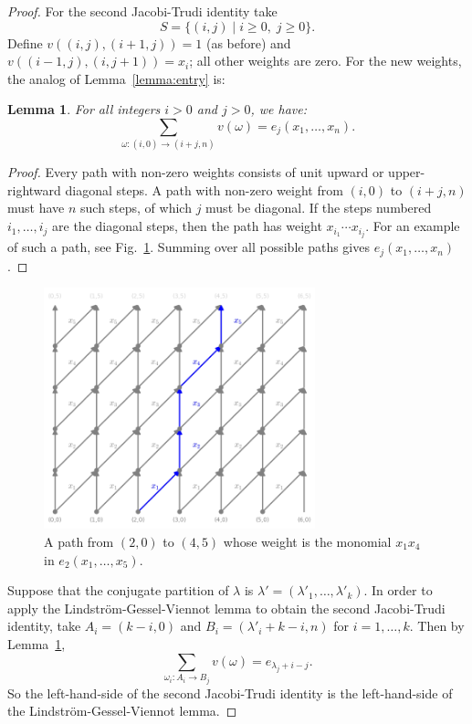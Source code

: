 \documentclass[11pt]{amsproc}
\newtheorem{lemma}[theorem]{Lemma}
\theoremstyle{definition}
\theoremstyle{example}
\begin{document}
\begin{proof}
  For the second Jacobi-Trudi identity take
  \begin{displaymath}
    S = \{(i,j)\mid i\geq 0,\;j\geq 0\}.
  \end{displaymath}
  Define $v((i,j),(i+1,j))=1$ (as before) and $v((i-1,j),(i,j+1))=x_i$; all other weights are zero.
  For the new weights, the analog of Lemma~\ref{lemma:entry} is:
  \begin{lemma}
    \label{lemma:entry-e}
    For all integers $i>0$ and $j>0$, we have:
    \begin{displaymath}
      \sum_{\omega:(i,0)\to (i+j,n)} v(\omega) = e_j(x_1,\dotsc,x_n).
    \end{displaymath}
  \end{lemma}
  \begin{proof}
    Every path with non-zero weights consists of unit upward or upper-rightward diagonal steps.
    A path with non-zero weight from $(i,0)$ to $(i+j,n)$ must have $n$ such steps, of which $j$ must be diagonal.
    If the steps numbered $i_1,\dotsc,i_j$ are the diagonal steps, then the path has weight $x_{i_1}\dotsb x_{i_j}$.
    For an example of such a path, see Fig.~\ref{fig:example_path_e}.
    Summing over all possible paths gives $e_j(x_1,\dotsc,x_n)$.
  \end{proof}
  \begin{figure}
    \centering
    \includegraphics[width=0.7\textwidth]{path_example2.png}
    \caption{A path from $(2,0)$ to $(4,5)$ whose weight is the monomial $x_1x_4$ in $e_2(x_1,\dotsc,x_5)$.}
    \label{fig:example_path_e}
  \end{figure}
  Suppose that the conjugate partition of $\lambda$ is $\lambda'=(\lambda'_1,\dotsc,\lambda'_k)$.
  In order to apply the Lindstr\"om-Gessel-Viennot lemma to obtain the second Jacobi-Trudi identity, take $A_i=(k-i, 0)$ and $B_i=(\lambda'_i+k-i, n)$ for $i=1,\dotsc,k$.
  Then by Lemma~\ref{lemma:entry-e},
  \begin{displaymath}
    \sum_{\omega_i:A_i\to B_j} v(\omega) = e_{\lambda_j+i-j}.
  \end{displaymath}
  So the left-hand-side of the second Jacobi-Trudi identity is the left-hand-side of the Lindstr\"om-Gessel-Viennot lemma.


\end{proof}
\end{document}
